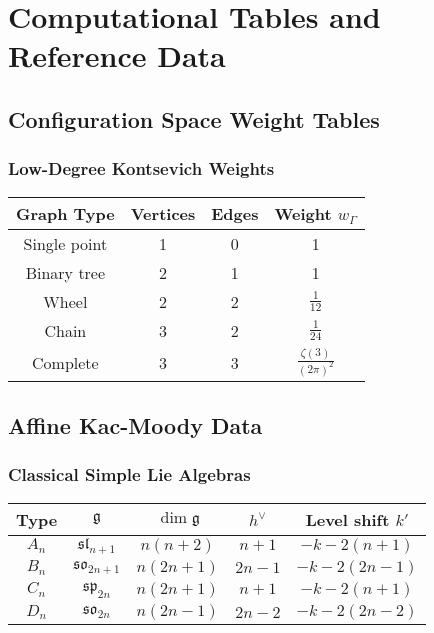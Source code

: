 \chapter{Computational Tables and Reference Data}
\label{app:computational-tables}

\section{Configuration Space Weight Tables}

\subsection{Low-Degree Kontsevich Weights}

\begin{center}
\begin{tabular}{|c|c|c|c|}
\hline
Graph Type & Vertices & Edges & Weight $w_\Gamma$ \\
\hline
Single point & 1 & 0 & 1 \\
\hline
Binary tree & 2 & 1 & 1 \\
\hline
Wheel & 2 & 2 & $\frac{1}{12}$ \\
\hline
Chain & 3 & 2 & $\frac{1}{24}$ \\
\hline
Complete & 3 & 3 & $\frac{\zeta(3)}{(2\pi)^2}$ \\
\hline
\end{tabular}
\end{center}

\section{Affine Kac-Moody Data}

\subsection{Classical Simple Lie Algebras}

\begin{center}
\begin{tabular}{|c|c|c|c|c|}
\hline
Type & $\mathfrak{g}$ & $\dim \mathfrak{g}$ & $h^\vee$ & Level shift $k'$ \\
\hline
$A_n$ & $\mathfrak{sl}_{n+1}$ & $n(n+2)$ & $n+1$ & $-k - 2(n+1)$ \\
\hline
$B_n$ & $\mathfrak{so}_{2n+1}$ & $n(2n+1)$ & $2n-1$ & $-k - 2(2n-1)$ \\
\hline
$C_n$ & $\mathfrak{sp}_{2n}$ & $n(2n+1)$ & $n+1$ & $-k - 2(n+1)$ \\
\hline
$D_n$ & $\mathfrak{so}_{2n}$ & $n(2n-1)$ & $2n-2$ & $-k - 2(2n-2)$ \\
\hline
\end{tabular}
\end{center}

